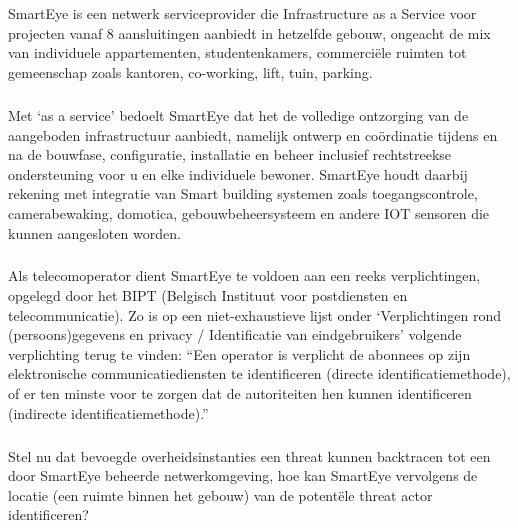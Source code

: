 
\chapter{}%
\label{ch:inleiding}

SmartEye is een netwerk serviceprovider die Infrastructure as a Service voor projecten vanaf 8 aansluitingen aanbiedt in hetzelfde gebouw, ongeacht de mix van individuele appartementen, studentenkamers, commerciële ruimten tot gemeenschap zoals kantoren, co-working, lift, tuin, parking.~\autocite{Smarteye2021}

\paragraph{}
Met ‘as a service’ bedoelt SmartEye dat het de volledige ontzorging van de aangeboden infrastructuur aanbiedt, namelijk ontwerp en coördinatie tijdens en na de bouwfase, configuratie, installatie en beheer inclusief rechtstreekse ondersteuning voor u en elke individuele bewoner. SmartEye houdt daarbij rekening met integratie van Smart building systemen zoals toegangscontrole, camerabewaking, domotica, gebouwbeheersysteem en andere IOT sensoren die kunnen aangesloten worden.~\autocite{Smarteye2021}

\paragraph{}
Als telecomoperator dient SmartEye te voldoen aan een reeks verplichtingen, opgelegd door het BIPT (Belgisch Instituut voor postdiensten en telecommunicatie). Zo is op een niet-exhaustieve lijst onder ‘Verplichtingen rond (persoons)\-gegevens en privacy / Identificatie van eindgebruikers’ volgende verplichting terug te vinden: “Een operator is verplicht de abonnees op zijn elektronische communicatiediensten te identificeren (directe identificatiemethode),\\of er ten minste voor te zorgen dat de autoriteiten hen kunnen identificeren (indirecte identificatiemethode).”~\autocite{BIPT2023}

\paragraph{}
Stel nu dat bevoegde overheidsinstanties een threat kunnen backtracen tot een door SmartEye beheerde netwerkomgeving, hoe kan SmartEye vervolgens de locatie (een ruimte binnen het gebouw) van de potentële threat actor identificeren?

